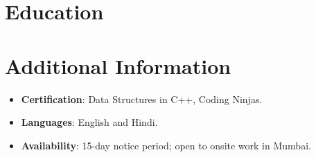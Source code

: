\documentclass[11pt,a4paper,sans]{moderncv}
\begin{document}

\section{Education}
\vspace{1pt}


\section{Additional Information}
\vspace{1pt}
\begin{itemize}
\item {\textbf{Certification}: Data Structures in C++, Coding Ninjas.}
\item {\textbf{Languages}: English and Hindi.}
\item {\textbf{Availability}: 15-day notice period; open to onsite work in Mumbai.}
\end{itemize}
\end{document}

